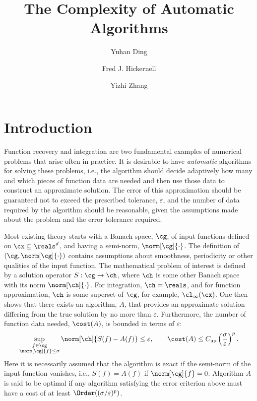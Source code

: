 \documentclass[final]{elsarticle}
\theoremstyle{definition}
\theoremstyle{remark}
\DeclareMathOperator{\up}{up}
\begin{document}
\begin{frontmatter}

\title{The Complexity of Automatic Algorithms}
\author{Yuhan Ding}
\author{Fred J. Hickernell}
\author{Yizhi Zhang}
\address{Room E1-208, Department of Applied Mathematics, Illinois Institute of Technology,\\ 10 W.\ 32$^{\text{nd}}$ St., Chicago, IL 60616}
\begin{abstract}
\end{abstract}

\begin{keyword}


\end{keyword}
\end{frontmatter}

\section{Introduction}
Function recovery and integration are two fundamental examples of numerical problems that arise often in practice.  It is desirable to have \emph{automatic} algorithms for solving these problems, i.e., the algorithm should decide adaptively how many and which pieces of function data are needed and then use those data to construct an approximate solution.  The error of this approximation should be guaranteed not to exceed the prescribed tolerance, $\varepsilon$, and the number of data required by the algorithm should be reasonable, given the assumptions made about the problem and the error tolerance required.

Most existing theory starts with a Banach space, $\cg$, of input functions defined on $\cx \subseteq \reals^d$, and having a semi-norm, $\norm[\cg]{\cdot}$.  The definition of $(\cg,\norm[\cg]{\cdot})$ contains assumptions about smoothness, periodicity or other qualities of the input function.  The mathematical problem of interest is defined by a solution operator $S:\cg \to \ch$, where $\ch$ is some other Banach space with its norm $\norm[\ch]{\cdot}$.  For integration, $\ch=\reals$, and for function approximation, $\ch$ is some superset of $\cg$, for example, $\cl_{\infty}(\cx)$. One then shows that there exists an algorithm, $A$, that provides an approximate solution differing from the true solution by no  more than $\varepsilon$.  Furthermore, the number of function data needed, $\cost(A)$, is bounded in terms of $\varepsilon$:
\begin{equation} \label{traditionerr}
\sup_{\substack{f \in \cg\\ \norm[\cg]{f} \le \sigma}} \norm[\ch]{S(f)-A(f)} \le \varepsilon, \qquad \cost(A)\le C_{\up}\left(\frac{\sigma}{\varepsilon}\right)^{p}.
\end{equation}
Here it is necessarily assumed that the algorithm is exact if the semi-norm of the input function vanishes, i.e., $S(f)=A(f)$ if $\norm[\cg]{f}=0$. Algorithm $A$ is said to be optimal if any algorithm satisfying the error criterion above must have a cost of at least $\Order((\sigma/\varepsilon)^{p})$.
\end{document}
